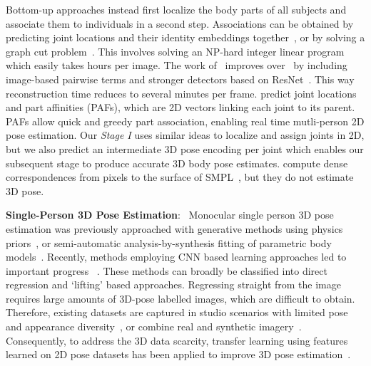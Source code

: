 \documentclass[acmtog,authorversion]{acmart}
\newcommand{\parahead}[1]{\textbf{#1}:\ }
\begin{document}
Bottom-up approaches instead first localize the body parts of all subjects and associate them to individuals in a second step. Associations can be obtained by predicting joint locations and their identity embeddings together~\cite{newell_associative_nips17}, or by solving a graph cut problem~\cite{pishchulin_deepcut_cvpr16,insafutdin_arttrack_cvpr17}. This involves solving an NP-hard integer linear program which easily takes hours per image. The work of~\citet{insafutdin_arttrack_cvpr17} improves over~\citet{pishchulin_deepcut_cvpr16} by including image-based pairwise terms and stronger detectors based on ResNet~\cite{he_resnet_cvpr2016}. This way reconstruction time reduces to several minutes per frame. 
\citet{cao_affinity_2017} predict joint locations and part affinities (PAFs), which are 2D vectors linking each joint to its parent. PAFs allow quick and greedy part association, enabling real time mutli-person 2D pose estimation. 
Our \textit{Stage I} uses similar ideas to localize and assign joints in 2D, but we also predict an intermediate 3D pose encoding per joint which enables our subsequent stage to produce accurate 3D body pose estimates.\citet{GulerNK18} compute dense correspondences from pixels to the surface of SMPL~, but they do not estimate 3D pose.



\parahead{Single-Person 3D Pose Estimation}
 Monocular single person 3D pose estimation was previously approached with generative methods using physics priors~\cite{Wei:2010:VideoMocap}, or semi-automatic analysis-by-synthesis fitting of parametric body models~\cite{Jain:2010:MovieReshape,Guan2009}.
Recently, methods employing CNN based learning approaches led to important progress ~\cite{ionescu_human36_pami14,sigal_humaneva_ijcv10,tekin_structured_bmvc16,pavlakos_volumetric_cvpr17,li_maximum_iccv2015,li_accv14,sun2017compositional,sun2018integral}. 
These methods can broadly be classified into direct regression and `lifting' based approaches. Regressing straight from the image requires large amounts of 3D-pose labelled images, which are difficult to obtain.
Therefore, existing datasets are captured in studio scenarios with limited pose and appearance diversity~\cite{ionescu_human36_pami14}, or combine real and synthetic imagery~\cite{Deep3DPose}.
Consequently, to address the 3D data scarcity, transfer learning using features learned on 2D pose datasets has been applied to improve 3D pose estimation~\cite{VNect_SIGGRAPH2017,mehta_mono_3dv17,popa2017deep,zhou2017towards,sun2017compositional,tekin_fusion_arxiv16}.
 
\end{document}
